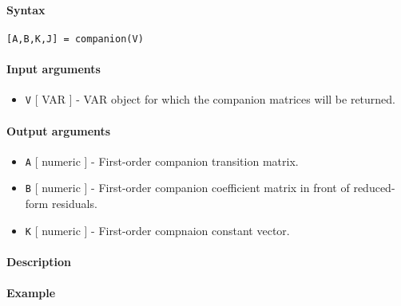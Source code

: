 


	\paragraph{Syntax}\label{syntax}

\begin{verbatim}
[A,B,K,J] = companion(V)
\end{verbatim}

\paragraph{Input arguments}\label{input-arguments}

\begin{itemize}
\itemsep1pt\parskip0pt
\item
  \texttt{V} {[} VAR {]} - VAR object for which the companion matrices
  will be returned.
\end{itemize}

\paragraph{Output arguments}\label{output-arguments}

\begin{itemize}
\item
  \texttt{A} {[} numeric {]} - First-order companion transition matrix.
\item
  \texttt{B} {[} numeric {]} - First-order companion coefficient matrix
  in front of reduced-form residuals.
\item
  \texttt{K} {[} numeric {]} - First-order compnaion constant vector.
\end{itemize}

\paragraph{Description}\label{description}

\paragraph{Example}\label{example}


